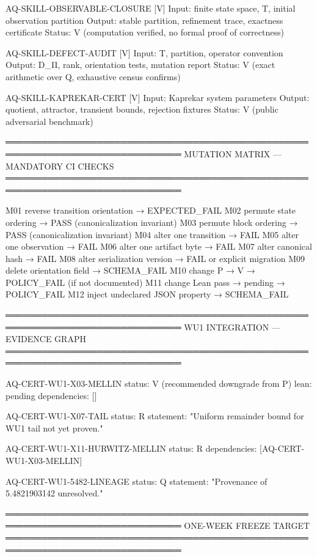AQ-SKILL-OBSERVABLE-CLOSURE [V]
  Input:  finite state space, T, initial observation partition
  Output: stable partition, refinement trace, exactness certificate
  Status: V (computation verified, no formal proof of correctness)

AQ-SKILL-DEFECT-AUDIT [V]
  Input:  T, partition, operator convention
  Output: D_Π, rank, orientation tests, mutation report
  Status: V (exact arithmetic over Q, exhaustive census confirms)

AQ-SKILL-KAPREKAR-CERT [V]
  Input:  Kaprekar system parameters
  Output: quotient, attractor, transient bounds, rejection fixtures
  Status: V (public adversarial benchmark)

═══════════════════════════════════════════════════════════════════════════════
MUTATION MATRIX — MANDATORY CI CHECKS
═══════════════════════════════════════════════════════════════════════════════

M01  reverse transition orientation     → EXPECTED_FAIL
M02  permute state ordering              → PASS (canonicalization invariant)
M03  permute block ordering              → PASS (canonicalization invariant)
M04  alter one transition                → FAIL
M05  alter one observation               → FAIL
M06  alter one artifact byte             → FAIL
M07  alter canonical hash                → FAIL
M08  alter serialization version         → FAIL or explicit migration
M09  delete orientation field            → SCHEMA_FAIL
M10  change P → V                         → POLICY_FAIL (if not documented)
M11  change Lean pass → pending           → POLICY_FAIL
M12  inject undeclared JSON property     → SCHEMA_FAIL

═══════════════════════════════════════════════════════════════════════════════
WU1 INTEGRATION — EVIDENCE GRAPH
═══════════════════════════════════════════════════════════════════════════════

AQ-CERT-WU1-X03-MELLIN
  status: V (recommended downgrade from P)
  lean: pending
  dependencies: []

AQ-CERT-WU1-X07-TAIL
  status: R
  statement: "Uniform remainder bound for WU1 tail not yet proven."

AQ-CERT-WU1-X11-HURWITZ-MELLIN
  status: R
  dependencies: [AQ-CERT-WU1-X03-MELLIN]

AQ-CERT-WU1-5482-LINEAGE
  status: Q
  statement: "Provenance of 5.4821903142 unresolved."

═══════════════════════════════════════════════════════════════════════════════
ONE-WEEK FREEZE TARGET
═══════════════════════════════════════════════════════════════════════════════

